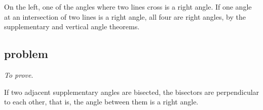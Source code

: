 \documentclass[11pt, oneside]{article}
\begin{document}
On the left, one of the angles where two lines cross is a right angle.  If one angle at an intersection of two lines is a right angle, all four are right angles, by the supplementary and vertical angle theorems.

\subsection*{problem}

\emph{To prove}.  

If two adjacent supplementary angles are bisected, the bisectors are perpendicular to each other, that is, the angle between them is a right angle.
\end{document}
